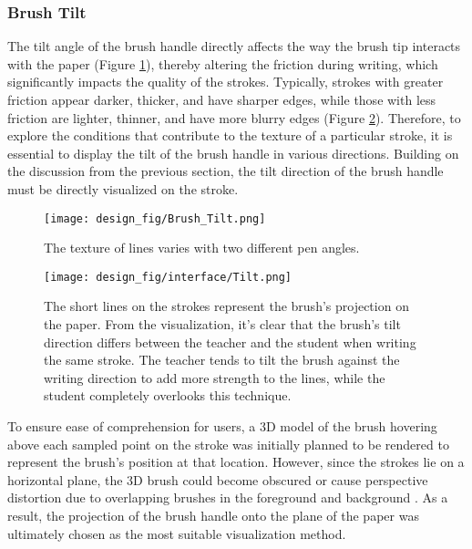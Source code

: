 \subsubsection{Brush Tilt}
The tilt angle of the brush handle directly affects the way the brush tip interacts with the paper (Figure \ref{fig:brush tilt}), thereby altering the friction during writing, which significantly impacts the quality of the strokes. Typically, strokes with greater friction appear darker, thicker, and have sharper edges, while those with less friction are lighter, thinner, and have more blurry edges (Figure \ref{fig:stroke splitting}). Therefore, to explore the conditions that contribute to the texture of a particular stroke, it is essential to display the tilt of the brush handle in various directions. Building on the discussion from the previous section, the tilt direction of the brush handle must be directly visualized on the stroke.
\begin{figure}[ht]
        \centering
        \texttt{[image: design\_fig/Brush\_Tilt.png]}
        \caption{The texture of lines varies with two different pen angles.}
        \label{fig:brush tilt}
\end{figure}

\begin{figure}[th]
        \centering
        \texttt{[image: design\_fig/interface/Tilt.png]}
        \caption{The short lines on the strokes represent the brush's projection on the paper. From the visualization, it's clear that the brush's tilt direction differs between the teacher and the student when writing the same stroke. The teacher tends to tilt the brush against the writing direction to add more strength to the lines, while the student completely overlooks this technique.}
        \label{fig:stroke splitting}
\end{figure}

To ensure ease of comprehension for users, a 3D model of the brush hovering above each sampled point on the stroke was initially planned to be rendered to represent the brush's position at that location. However, since the strokes lie on a horizontal plane, the 3D brush could become obscured or cause perspective distortion due to overlapping brushes in the foreground and background \cite{munzner2015visualization}. As a result, the projection of the brush handle onto the plane of the paper was ultimately chosen as the most suitable visualization method.


